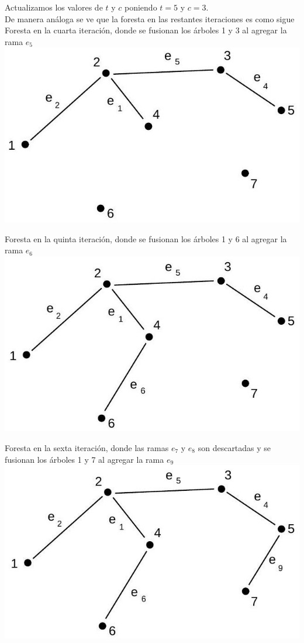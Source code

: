 \documentclass[10pt]{article}
\begin{document}
Actualizamos los valores de $t$ y $c$ poniendo $t=5$ y $c=3$.\\
De manera análoga se ve que la foresta en las restantes iteraciones es como sigue\\
Foresta en la cuarta iteración, donde se fusionan los árboles 1 y 3 al agregar la rama $e_{5}$\\
\includegraphics[max width=\textwidth, center]{2025_09_05_93c7c1835f249f70c0eeg-24(3)}

Foresta en la quinta iteración, donde se fusionan los árboles 1 y 6 al agregar la rama $e_{6}$\\
\includegraphics[max width=\textwidth, center]{2025_09_05_93c7c1835f249f70c0eeg-24}

Foresta en la sexta iteración, donde las ramas $e_{7}$ y $e_{8}$ son descartadas y se fusionan los árboles 1 y 7 al agregar la rama $e_{9}$\\
\includegraphics[max width=\textwidth, center]{2025_09_05_93c7c1835f249f70c0eeg-24(2)}
\end{document}
